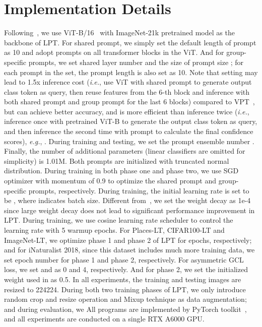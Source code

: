 \documentclass{article} \usepackage{iclr2023_conference,times}
\newcommand{\eg}{\emph{e.g.}}
\newcommand{\ie}{\emph{i.e.}}
\begin{document}
\section{Implementation Details}\label{sec:impl_detail}
Following~\citet{jia2022vpt,wang2022learning}, we use ViT-B/16~\citep{dosovitskiy2021an} with ImageNet-21k pretrained model as the backbone of LPT.
For shared prompt, we simply set the default length of prompt as 10 and adopt prompts on all transformer blocks in the ViT. 
And for group-specific prompts, we set shared layer number  and the size of prompt size ; for each prompt in the set, the prompt length is also set as 10. 
Note that setting  may lead to 1.5x inference cost (\ie, use ViT with shared prompt to generate output class token as query, then reuse features from the 6-th block and inference with both shared prompt and group prompt for the last 6 blocks) compared to VPT~\citep{jia2022vpt}, but can achieve better accuracy, and is more efficient than inference twice (\ie, inference once with pretrained ViT-B to generate the output class token as query, and then inference the second time with prompt to calculate the final confidence scores), \eg, \citet{wang2022learning}.
During training and testing, we set the prompt ensemble number . 
Finally, the number of additional parameters (linear classifiers are omitted for simplicity) is 1.01M.  
Both prompts are initialized with truncated normal distribution. 
During training in both phase one and phase two, we use SGD optimizer with momentum of 0.9 to optimize the shared prompt and group-specific prompts, respectively. 
During training, the initial learning rate is set to be , where  indicates batch size. Different from~\citet{Alshammari_2022_CVPR}, we set the weight decay as 1e-4 since large weight decay does not lead to significant performance improvement in LPT. During training, we use cosine learning rate scheduler to control the learning rate with 5 warmup epochs. 
For Places-LT, CIFAR100-LT and ImageNet-LT, we optimize phase 1 and phase 2 of LPT for  epochs, respectively; and for iNaturalist 2018, since this dataset includes much more training data, we set epoch number  for phase 1 and phase 2, respectively. 
For asymmetric GCL loss, we set  and  as 0 and 4, respectively. 
And for phase 2, we set the initialized weight  used in  as 0.5. 
In all experiments, the training and testing images are resized to 224224.
During both two training phases of LPT, we only introduce random crop and resize operation and Mixup technique as data augmentation; and during evaluation, we 
All programs are implemented by PyTorch toolkit~\citep{NEURIPS2019_9015}, and all experiments are
conducted on a single RTX A6000 GPU.
\end{document}
